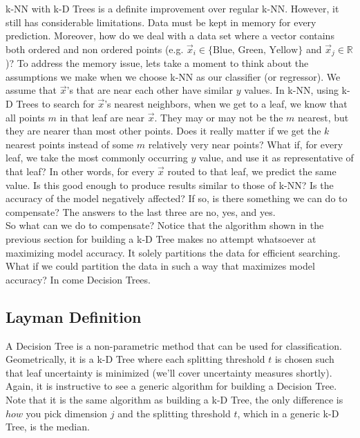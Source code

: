 \documentclass[10pt]{article}
\begin{document}
		\noindent k-NN with k-D Trees is a definite improvement over 
		regular k-NN. However, it still has considerable limitations. Data must be kept
		 in memory for every prediction. Moreover, how do we deal with a data set where a vector contains both 
		ordered and non ordered points (e.g. $\vec x_i \in \{ \textrm{Blue, Green, Yellow} \}$ and $\vec x_j \in \mathbb{R}$)?
		To address the memory issue, lets take a moment to think about the assumptions we make when we choose 
		k-NN as our classifier (or regressor). We assume that $ \vec x$'s that are near each other have similar $y$ values.
		In k-NN, using k-D Trees to search for $\vec x$'s nearest neighbors, when we get to a leaf, we know that all points
		$m$ in that leaf are near $\vec x$. They may or may not be the $m$ nearest, but they are nearer than most other points.   
		Does it really matter if we get the $k$ nearest points instead of some $m$ relatively very near points?
		What if, for every leaf, we take the most commonly occurring $y$ value, and use it as representative of that leaf? In other
		words, for every $\vec x$ routed to that leaf, we predict the same value. Is this good enough to produce results similar to 
		those of k-NN? Is the accuracy of the model negatively affected? If so, is there something we can do to compensate? 
		The answers to the last three are no, yes, and yes. \\
		
		So what can we do to compensate? Notice that the algorithm shown in the previous section for building a 
		k-D Tree makes no attempt whatsoever at maximizing model accuracy. It solely partitions the data for 
		efficient searching. What if we could partition the data in such a way that maximizes model accuracy? 
		In come Decision Trees. 
	
	\subsection*{Layman Definition}
		A Decision Tree is a non-parametric method that can be used for classification. Geometrically, 
		it is a k-D Tree where each splitting threshold $t$ is chosen such that leaf uncertainty is minimized (we'll cover 
		uncertainty measures shortly). Again, it is instructive to see a generic algorithm for building a Decision Tree. Note 
		that it is the same algorithm as building a k-D Tree, the only difference is $how$ you pick dimension $j$ and the 
		splitting threshold $t$, which in a generic k-D Tree, is the median.\\
	
\end{document}
